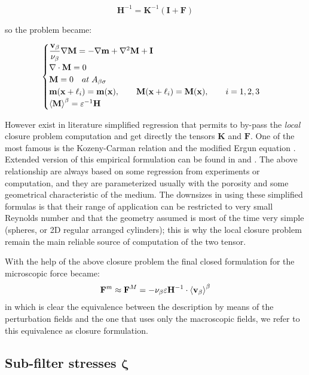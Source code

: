 $$
\mathbf{H}^{-1} = \mathbf{K}^{-1} \left(\mathbf{I} +\mathbf{F}\right)
$$

so the problem became:

\begin{eqnarray}
	\begin{cases}
		\dfrac{\textbf{v}_{\beta}}{\nu_{\beta}} \nabla \mathbf{M} = -\nabla \mathbf{m} + \nabla^2 \mathbf{M} +\mathbf{I}\\
		\nabla \cdot \mathbf{M} = 0  \\
		\mathbf{M} = 0 \quad at \; A_{\beta \sigma} \\
		\mathbf{m}(\mathbf{x} +\ell_i) = \mathbf{m}(\mathbf{x}), \qquad \mathbf{M}(\mathbf{x} +\ell_i) = \mathbf{M}(\mathbf{x}), \qquad i=1,2,3 \\
		{\left< \mathbf{M} \right>}^{\beta} = \varepsilon^{-1} \mathbf{H}
	\end{cases}
\label{eq:M_problem}
\end{eqnarray}

However exist in literature simplified regression that permits to by-pass the \textit{local} closure problem computation and get directly the tensors $\mathbf{K}$ and $\mathbf{F}$.
One of the most famous is the Kozeny-Carman relation \citet{kozeny} and the modified Ergun equation \cite{transport2002bird}.
Extended version of this empirical formulation can be found in \citet{zampogna2016fluid} and \cite{yazdchi2012towards}.
The above relationship are always based on some regression from experiments or computation, and they are parameterized usually with the porosity and some geometrical characteristic of the medium.
The downsizes in using these simplified formulas is that their range of application can be restricted to very small Reynolds number and that the geometry assumed is most of the time very simple (spheres, or 2D regular arranged cylinders); this is why the local closure problem remain the main reliable source of computation of the two tensor.

With the help of the above closure problem the final closed formulation for the microscopic force became:
\begin{equation}
\mathbf{F}^m \approx \mathbf{F}^M = - \nu_{\beta} \varepsilon \mathbf{H}^{-1} \cdot {\left< \textbf{v}_{\beta}\right>}^{\beta}
\label{eq:closure_final}
\end{equation}
in which is clear the equivalence between the description by means of the perturbation fields and the one that uses only the macroscopic  fields, we refer to this equivalence as closure formulation.


\subsection{Sub-filter stresses $\boldsymbol{\zeta}$}

